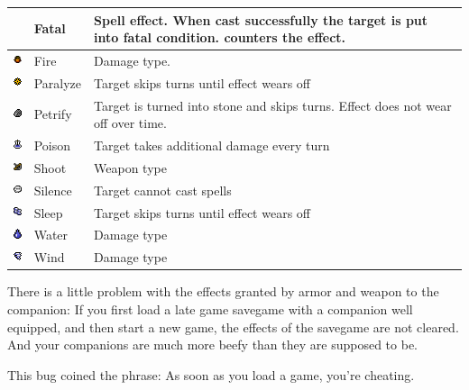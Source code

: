 \begin{longtable}{ l l p{7cm} }
	& Fatal
	& Spell effect. When cast successfully the target is put into fatal condition. \nameref{spell:life} counters the effect.
\\ \hline
	\includegraphics[height=1em,keepaspectratio]{./resources/effects/fire}
	& Fire 
	& Damage type.
\\ \hline
	\includegraphics[height=1em,keepaspectratio]{./resources/effects/paralyze}
	& Paralyze 
	& Target skips turns until effect wears off
\\ \hline
	\includegraphics[height=1em,keepaspectratio]{./resources/effects/petrify}
	& Petrify 
	& Target is turned into stone and skips turns. Effect does not wear off over time.
\\ \hline
	\includegraphics[height=1em,keepaspectratio]{./resources/effects/poison}
	& Poison 
	& Target takes additional damage every turn
\\ \hline
	\includegraphics[height=1em,keepaspectratio]{./resources/effects/shoot}
	& Shoot 
	& Weapon type
\\ \hline
	\includegraphics[height=1em,keepaspectratio]{./resources/effects/silence}
	& Silence 
	& Target cannot cast spells
\\ \hline
	\includegraphics[height=1em,keepaspectratio]{./resources/effects/sleep}
	& Sleep 
	& Target skips turns until effect wears off
\\ \hline
	\includegraphics[height=1em,keepaspectratio]{./resources/effects/water}
	& Water 
	& Damage type
\\ \hline
	\includegraphics[height=1em,keepaspectratio]{./resources/effects/wind}
	& Wind 
	& Damage type
\end{longtable}

There is a little problem with the effects granted by armor and weapon to the companion: If you first load a late game savegame with a companion well equipped, and then start a new game, the effects of the savegame are not cleared. And your companions are much more beefy than they are supposed to be.

This bug coined the phrase: As soon as you load a game, you're cheating.
